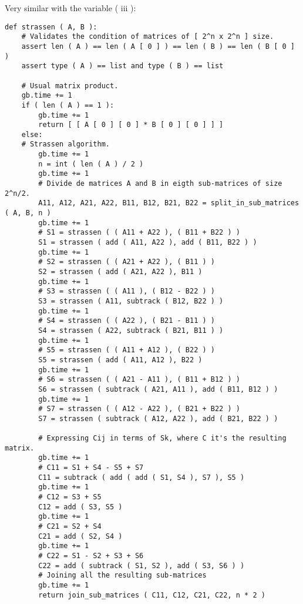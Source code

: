 \pagebreak

Very similar with the variable ( iii ): \hfill \break

\begin{lstlisting}
def strassen ( A, B ):
    # Validates the condition of matrices of [ 2^n x 2^n ] size.
    assert len ( A ) == len ( A [ 0 ] ) == len ( B ) == len ( B [ 0 ] )
    assert type ( A ) == list and type ( B ) == list

    # Usual matrix product.
    gb.time += 1
    if ( len ( A ) == 1 ):
        gb.time += 1
        return [ [ A [ 0 ] [ 0 ] * B [ 0 ] [ 0 ] ] ]
    else:
    # Strassen algorithm.
        gb.time += 1
        n = int ( len ( A ) / 2 )
        gb.time += 1
        # Divide de matrices A and B in eigth sub-matrices of size 2^n/2.
        A11, A12, A21, A22, B11, B12, B21, B22 = split_in_sub_matrices ( A, B, n )
        gb.time += 1
        # S1 = strassen ( ( A11 + A22 ), ( B11 + B22 ) )
        S1 = strassen ( add ( A11, A22 ), add ( B11, B22 ) )
        gb.time += 1
        # S2 = strassen ( ( A21 + A22 ), ( B11 ) )
        S2 = strassen ( add ( A21, A22 ), B11 )
        gb.time += 1
        # S3 = strassen ( ( A11 ), ( B12 - B22 ) )
        S3 = strassen ( A11, subtrack ( B12, B22 ) )
        gb.time += 1
        # S4 = strassen ( ( A22 ), ( B21 - B11 ) )
        S4 = strassen ( A22, subtrack ( B21, B11 ) )
        gb.time += 1
        # S5 = strassen ( ( A11 + A12 ), ( B22 ) )
        S5 = strassen ( add ( A11, A12 ), B22 )
        gb.time += 1
        # S6 = strassen ( ( A21 - A11 ), ( B11 + B12 ) )
        S6 = strassen ( subtrack ( A21, A11 ), add ( B11, B12 ) )
        gb.time += 1
        # S7 = strassen ( ( A12 - A22 ), ( B21 + B22 ) )
        S7 = strassen ( subtrack ( A12, A22 ), add ( B21, B22 ) )

        # Expressing Cij in terms of Sk, where C it's the resulting matrix.
        gb.time += 1
        # C11 = S1 + S4 - S5 + S7
        C11 = subtrack ( add ( add ( S1, S4 ), S7 ), S5 )
        gb.time += 1
        # C12 = S3 + S5
        C12 = add ( S3, S5 )
        gb.time += 1
        # C21 = S2 + S4
        C21 = add ( S2, S4 )
        gb.time += 1
        # C22 = S1 - S2 + S3 + S6
        C22 = add ( subtrack ( S1, S2 ), add ( S3, S6 ) )
        # Joining all the resulting sub-matrices
        gb.time += 1
        return join_sub_matrices ( C11, C12, C21, C22, n * 2 )
\end{lstlisting}

\pagebreak


